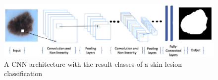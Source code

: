 \begin{figure}
    \centerline{\includegraphics[width=1\columnwidth]{03-neural-networks-in-tumor-detection/figures/cnn-architecture-image-classification.png}}
    \caption{ A CNN architecture with the result classes of a skin lesion classification}
    \label{fig:sample-cnn-architecture-skin-lesion-classification}
\end{figure}